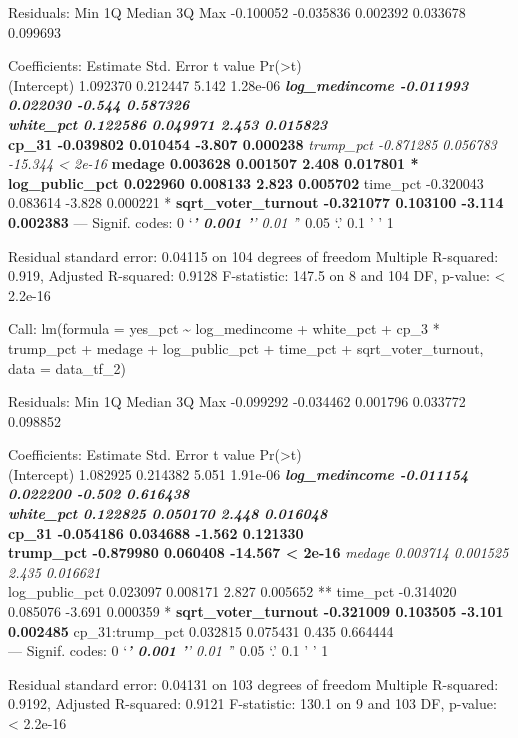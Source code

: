 \documentclass[
]{article}
\begin{document}
Residuals: Min 1Q Median 3Q Max -0.100052 -0.035836 0.002392 0.033678
0.099693

Coefficients: Estimate Std. Error t value
Pr(\textgreater\textbar t\textbar)\\
(Intercept) 1.092370 0.212447 5.142 1.28e-06 \textbf{\emph{
log\_medincome -0.011993 0.022030 -0.544 0.587326\\
white\_pct 0.122586 0.049971 2.453 0.015823 }\\
cp\_31 -0.039802 0.010454 -3.807 0.000238 }\emph{ trump\_pct -0.871285
0.056783 -15.344 \textless{} 2e-16 }\textbf{ medage 0.003628 0.001507
2.408 0.017801 *\\
log\_public\_pct 0.022960 0.008133 2.823 0.005702 } time\_pct -0.320043
0.083614 -3.828 0.000221 *\textbf{ sqrt\_voter\_turnout -0.321077
0.103100 -3.114 0.002383 } --- Signif. codes: 0 `\emph{\textbf{' 0.001
'}' 0.01 '}' 0.05 `.' 0.1 ' ' 1

Residual standard error: 0.04115 on 104 degrees of freedom Multiple
R-squared: 0.919, Adjusted R-squared: 0.9128 F-statistic: 147.5 on 8 and
104 DF, p-value: \textless{} 2.2e-16

Call: lm(formula = yes\_pct \textasciitilde{} log\_medincome +
white\_pct + cp\_3 * trump\_pct + medage + log\_public\_pct + time\_pct
+ sqrt\_voter\_turnout, data = data\_tf\_2)

Residuals: Min 1Q Median 3Q Max -0.099292 -0.034462 0.001796 0.033772
0.098852

Coefficients: Estimate Std. Error t value
Pr(\textgreater\textbar t\textbar)\\
(Intercept) 1.082925 0.214382 5.051 1.91e-06 \textbf{\emph{
log\_medincome -0.011154 0.022200 -0.502 0.616438\\
white\_pct 0.122825 0.050170 2.448 0.016048 }\\
cp\_31 -0.054186 0.034688 -1.562 0.121330\\
trump\_pct -0.879980 0.060408 -14.567 \textless{} 2e-16 }\emph{ medage
0.003714 0.001525 2.435 0.016621 }\\
log\_public\_pct 0.023097 0.008171 2.827 0.005652 ** time\_pct -0.314020
0.085076 -3.691 0.000359 *\textbf{ sqrt\_voter\_turnout -0.321009
0.103505 -3.101 0.002485 } cp\_31:trump\_pct 0.032815 0.075431 0.435
0.664444\\
--- Signif. codes: 0 `\emph{\textbf{' 0.001 '}' 0.01 '}' 0.05 `.' 0.1 '
' 1

Residual standard error: 0.04131 on 103 degrees of freedom Multiple
R-squared: 0.9192, Adjusted R-squared: 0.9121 F-statistic: 130.1 on 9
and 103 DF, p-value: \textless{} 2.2e-16
\end{document}
